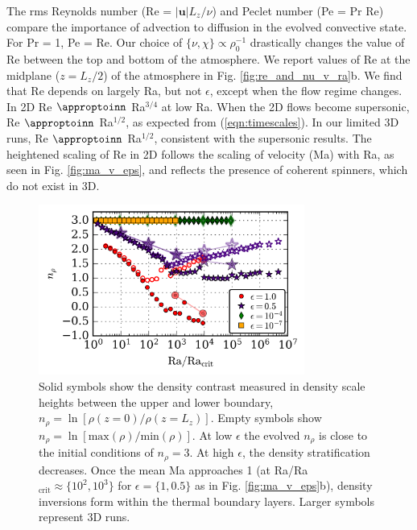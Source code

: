 \documentclass[aps, prl, twocolumn, nofootinbib, groupedaddress, amsfonts, amssymb, amsmath]{revtex4-1}
\newcommand{\approptoinn}[2]{\mathrel{\vcenter{
	\offinterlineskip\halign{\hfil$##$\cr
	#1\propto\cr\noalign{\kern2pt}#1\sim\cr\noalign{\kern-2pt}}}}}
\newcommand{\appropto}{\mathpalette\approptoinn\relax}
\begin{document}
The rms Reynolds number (Re = $|\bm{u}|L_z/\nu$) and Peclet number
(Pe = Pr Re)
compare the importance of advection to diffusion in the evolved
convective state.  For Pr = 1, Pe = Re.  
Our choice of $\{\nu,\chi\}\propto \rho_0^{-1}$ drastically changes
the value of Re between the top and bottom of the atmosphere.  We report values of
Re at the midplane ($z=L_z/2$) of the atmosphere in
Fig. \ref{fig:re_and_nu_v_ra}b.  We find that Re
depends on largely Ra, but not $\epsilon$, except when the flow regime
changes.
In 2D Re $\appropto$ Ra$^{3/4}$ at low Ra.    When the 2D flows
become supersonic, 
Re $\appropto$ Ra$^{1/2}$, as expected
from (\ref{eqn:timescales}).
In our limited 3D runs,
Re $\appropto$ Ra$^{1/2}$, consistent with the supersonic results.
The heightened scaling
of Re in 2D follows the scaling of velocity (Ma) with Ra, as
seen in Fig. \ref{fig:ma_v_eps}, and reflects the presence of coherent
spinners, which do not exist in 3D.

\begin{figure}[t]
\includegraphics[width=3.4375in]{./figs/density_v_ra.png}
\caption{\label{fig:nrho_v_ra} 
Solid symbols show the density contrast measured
in density scale heights between the upper and lower boundary, 
$n_\rho = \ln[\rho(z=0)/\rho(z=L_z)]$.
Empty symbols show 
$n_\rho = \ln[\text{max}(\rho)/\text{min}(\rho)]$. 
At low $\epsilon$ the evolved
$n_{\rho}$ is close to the initial conditions of $n_\rho = 3$.  
At high $\epsilon$,
the density stratification decreases.  Once the mean 
Ma approaches 1 (at Ra/Ra$_{\text{crit}} \approx \{10^2, 10^3\}$ for $\epsilon = \{1, 0.5\}$
as in Fig. \ref{fig:ma_v_eps}b), density inversions form within the thermal
boundary layers. Larger symbols represent 3D runs.}
\end{figure}
\end{document}
